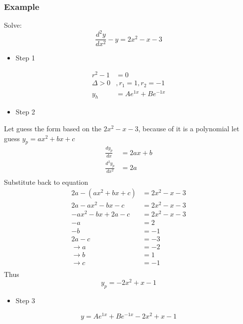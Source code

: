 \documentclass[12pt,a4paper]{article}
\begin{document}
	
	\subsubsection{Example}
	Solve:
	\[
	\frac{d^2y}{dx^2} - y= 2x^2 - x - 3
	\]
	\begin{itemize}
		\item Step 1
	\end{itemize}
	\[
	\begin{split}
		r^2 - 1 &= 0 \\
		\Delta > 0 &, r_1=1,r_2=-1 \\
		y_h &= Ae^{1x} + Be^{-1x}
	\end{split}
	\]
	\begin{itemize}
		\item Step 2
	\end{itemize}
	Let guess the form based on the \(2x^2 - x - 3\), because of it is a polynomial let guess \(y_p = ax^2 + bx + c\)
	\[
	\begin{split}
		\frac{dy_p}{dx} &= 2ax+b \\
		\frac{d^2y_p}{dx^2} &= 2a \\
	\end{split}
	\]
	Substitute back to equation
	\[
	\begin{split}
		2a - (ax^2 + bx + c) &= 2x^2 - x - 3 \\
		2a - ax^2 - bx - c &= 2x^2 - x - 3 \\
		-ax^2-bx+2a-c &=2x^2 - x - 3 \\
		-a &= 2 \\
		-b &= -1 \\
		2a-c &= -3 \\
		\rightarrow a &= -2 \\
		\rightarrow b &= 1 \\
		\rightarrow c &= -1 \\
	\end{split}
	\]
	Thus
	\[
	y_p = -2x^2 + x - 1
	\]
	\begin{itemize}
		\item Step 3
	\end{itemize}
	\[
	y =  Ae^{1x} + Be^{-1x} -2x^2 + x - 1
	\]
\end{document}
